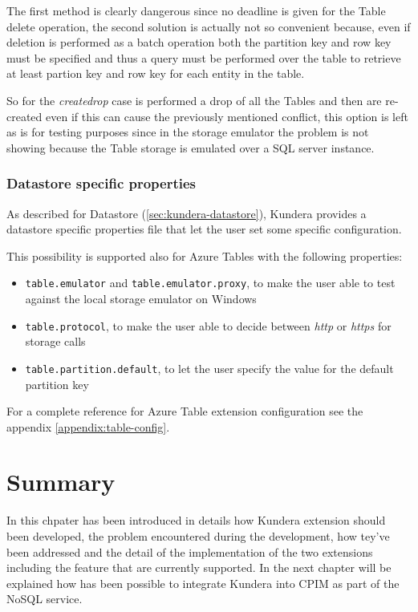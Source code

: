 \noindent The first method is clearly dangerous since no deadline is given for the Table delete operation, the second solution is actually not so convenient because, even if deletion is performed as a batch operation both the partition key and row key must be specified and thus a query must be performed over the table to retrieve at least partion key and row key for each entity in the table.  

\noindent So for the \textit{create\textunderscore drop} case is performed a drop of all the Tables and then are re-created even if this can cause the previously mentioned conflict, this option is left as is for testing purposes since in the storage emulator the problem is not showing because the Table storage is emulated over a SQL server instance.

\subsubsection{Datastore specific properties}
As described for Datastore (\ref{sec:kundera-datastore}), Kundera provides a datastore specific properties file that let the user set some specific configuration.

\noindent This possibility is supported also for Azure Tables with the following properties:
\begin{itemize}
\item \texttt{table.emulator} and \texttt{table.emulator.proxy}, to make the user able to test against the local storage emulator on Windows
\item \texttt{table.protocol}, to make the user able to decide between \textit{http} or \textit{https} for storage calls
\item \texttt{table.partition.default}, to let the user specify the value for the default partition key 
\end{itemize} 

\newparagraph For a complete reference for Azure Table extension configuration see the appendix \ref{appendix:table-config}.

\section{Summary}
In this chpater has been introduced in details how Kundera extension should been developed, the problem encountered during the development, how tey've been addressed and the detail of the implementation of the two extensions including the feature that are currently supported.
In the next chapter will be explained how has been possible to integrate Kundera into CPIM as part of the NoSQL service.
